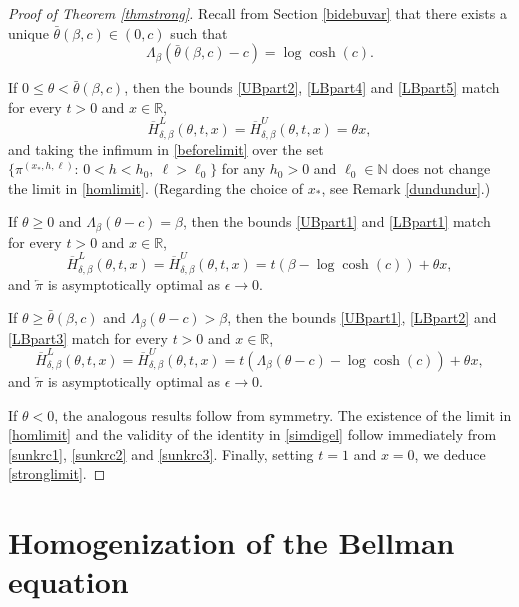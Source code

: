 \documentclass[a4paper]{amsart}
\numberwithin{equation}{section}
\theoremstyle{plain}
\theoremstyle{remark}
\begin{document}
\begin{proof}[Proof of Theorem \ref{thmstrong}]
	
Recall from Section \ref{bidebuvar} that there exists a unique $\bar\theta(\beta,c)\in(0,c)$ such that
$$\Lambda_\beta(\bar\theta(\beta,c)-c) = \log\cosh(c).$$

If $0\le\theta < \bar\theta(\beta,c)$, then the bounds \eqref{UBpart2}, \eqref{LBpart4} and \eqref{LBpart5} match for every $t>0$ and $x\in\mathbb{R}$,
\begin{equation}\label{sunkrc1} 
\overline H_{\delta,\beta}^L(\theta,t,x) = \overline H_{\delta,\beta}^U(\theta,t,x) = \theta x,
\end{equation}
and taking the infimum in \eqref{beforelimit} over the set $\{{\pi^{(x_*,h,\ell)}}:\,0<h<h_0,\ \ell>\ell_0\}$ for any $h_0>0$ and $\ell_0\in\mathbb{N}$ does not change the limit in \eqref{homlimit}. (Regarding the choice of $x_*$, see Remark \ref{dundundur}.)

If $\theta \ge 0$ and $\Lambda_\beta(\theta-c) = \beta$, then the bounds \eqref{UBpart1} and \eqref{LBpart1} match for every $t>0$ and $x\in\mathbb{R}$,
\begin{equation}\label{sunkrc2} 
\overline H_{\delta,\beta}^L(\theta,t,x) = \overline H_{\delta,\beta}^U(\theta,t,x) = t(\beta - \log\cosh(c)) + \theta x,
\end{equation}
and ${\overleftarrow\pi}$ is asymptotically optimal as ${\epsilon}\to0$.

If $\theta \ge \bar\theta(\beta,c)$ and $\Lambda_\beta(\theta-c) > \beta$, then the bounds \eqref{UBpart1}, \eqref{LBpart2} and \eqref{LBpart3} match for every $t>0$ and $x\in\mathbb{R}$,
\begin{equation}\label{sunkrc3} 
\overline H_{\delta,\beta}^L(\theta,t,x) = \overline H_{\delta,\beta}^U(\theta,t,x) = t(\Lambda_\beta(\theta-c) - \log\cosh(c)) + \theta x,
\end{equation}
and ${\overleftarrow\pi}$ is asymptotically optimal as ${\epsilon}\to0$.

If $\theta<0$, the analogous results follow from symmetry. The existence of the limit in \eqref{homlimit} and the validity of the identity in \eqref{simdigel} follow immediately from \eqref{sunkrc1}, \eqref{sunkrc2} and \eqref{sunkrc3}. Finally, setting $t=1$ and $x=0$, we deduce \eqref{stronglimit}.
\end{proof}

\section{Homogenization of the Bellman equation}\label{sechomo}
\end{document}
